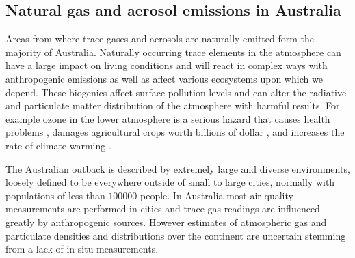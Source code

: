 \subsection{Natural gas and aerosol emissions in Australia}

Areas from where trace gases and aerosols are naturally emitted form the majority of Australia.
Naturally occurring trace elements in the atmosphere can have a large impact on living conditions and will react in complex ways with anthropogenic emissions as well as affect various ecosystems upon which we depend.
These biogenics affect surface pollution levels and can alter the radiative and particulate matter distribution of the atmosphere with harmful results.
For example ozone in the lower atmosphere is a serious hazard that causes health problems \cite{Hsieh_2013}, damages agricultural crops worth billions of dollar \cite{Avnery_2011}, and increases the rate of climate warming \cite{IPCC_2013_chap8}.

The Australian outback is described by extremely large and diverse environments, loosely defined to be everywhere outside of small to large cities, normally with populations of less than $100000$ people.
In Australia most air quality measurements are performed in cities and trace gas readings are influenced greatly by anthropogenic sources.
However estimates of atmospheric gas and particulate densities and distributions over the continent are uncertain stemming from a lack of in-situ measurements.

  